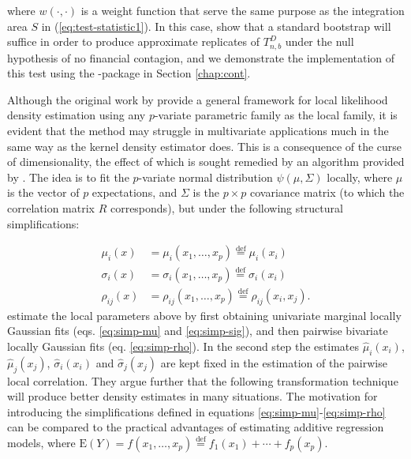 where $w(\cdot, \cdot)$ is a weight function that serve the same purpose as the integration area $S$ in (\ref{eq:test-statistic1}). In this case, \citet{stov:tjos:huft:2014} show that a standard bootstrap will suffice in order to produce approximate replicates of $T_{n,b}^D$ under the null hypothesis of no financial contagion, and we demonstrate the implementation of this test using the -package in Section \ref{chap:cont}.

Although the original work by \citet{hjor:jone:1996} provide a general framework for local likelihood density estimation using any $p$-variate parametric family as the local family, it is evident that the method may struggle in multivariate applications much in the same way as the kernel density estimator does. This is a consequence of the curse of dimensionality, the effect of which is sought remedied by an algorithm provided by \citet{otne:tjos:2017}. The idea is to fit the $p$-variate normal distribution $\psi(\mu, \Sigma)$ locally, where $\mu$ is the vector of $p$ expectations, and $\Sigma$ is the $p\times p$ covariance matrix (to which the correlation matrix $R$ corresponds), but under the following structural simplifications:

\begin{align}
\mu_i(x) &= \mu_i(x_1, \ldots, x_p) \stackrel{\textrm{def}}{=} \mu_i(x_i) \label{eq:simp-mu}\\
\sigma_i(x) &= \sigma_i(x_1, \ldots, x_p)  \stackrel{\textrm{def}}{=} \sigma_i(x_i) \label{eq:simp-sig} \\
\rho_{ij}(x) &= \rho_{ij}(x_1, \ldots, x_p) \stackrel{\textrm{def}}{=} \rho_{ij}(x_i, x_j). \label{eq:simp-rho}
\end{align}
\citet{otne:tjos:2017} estimate the local parameters above by first obtaining univariate marginal locally Gaussian fits (eqs. \ref{eq:simp-mu} and \ref{eq:simp-sig}), and then pairwise bivariate locally Gaussian fits (eq. \ref{eq:simp-rho}). In the second step the estimates $\widehat\mu_i(x_i)$, $\widehat\mu_j(x_j)$, $\widehat\sigma_i(x_i)$ and $\widehat\sigma_j(x_j)$ are kept fixed in the estimation of the pairwise local correlation. They argue further that the following transformation technique will produce better density estimates in many situations. The motivation for introducing the simplifications defined in equations \ref{eq:simp-mu}-\ref{eq:simp-rho} can be compared to the practical advantages of estimating additive regression models, where $\textrm{E}(Y) = f(x_1, \ldots, x_p) \stackrel{\textrm{def}}{=} f_1(x_1) + \cdots + f_p(x_p)$.

